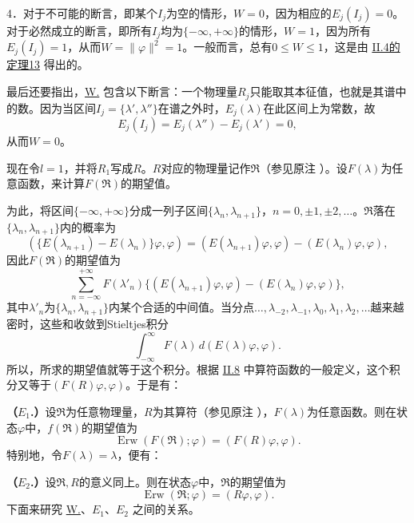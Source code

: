 \documentclass[fontsize=13pt,twoside,openany,headings=normal,parskip=false,bookmarkpackage=false,DIV=calc]{scrbook}
\begin{document}
\hypertarget{origpage-105}{}\label{origpage-105}4．对于不可能的断言，即某个$I_j$为空的情形，$W=0$，因为相应的$E_j(I_j)=0$。对于必然成立的断言，即所有$I_j$均为$\{-\infty,\allowbreak +\infty\}$的情形，$W=1$，因为所有$E_j(I_j)=1$，从而$W=\|\varphi\|^2=1$。一般而言，总有$0\le W\le1$，这是由 \hyperref[thm:II.13]{II.4的定理13} 得出的。

最后还要指出，\hyperref[post:III.1.W]{W.} 包含以下断言：一个物理量$R_j$只能取其本征值，也就是其谱中的数。因为当区间$I_j=\{\lambda',\allowbreak \lambda''\}$在谱之外时，$E_j(\lambda)$在此区间上为常数，故
\[
E_j(I_j)=E_j(\lambda'')-E_j(\lambda')=0,
\]
从而$W=0$。

现在令$l=1$，并将$R_1$写成$R$。$R$对应的物理量记作$\mathfrak R$（参见原注 \hyperlink{note-119}{}）。设$F(\lambda)$为任意函数，来计算$F(\mathfrak R)$的期望值。

为此，将区间$\{-\infty,\allowbreak +\infty\}$分成一列子区间$\{\lambda_n,\allowbreak \lambda_{n+1}\}$，$n=0,\allowbreak \pm1,\allowbreak \pm2,\allowbreak \ldots$。$\mathfrak R$落在$\{\lambda_n,\allowbreak \lambda_{n+1}\}$内的概率为
\[
(\{E(\lambda_{n+1})-E(\lambda_n)\}\varphi,\varphi)
=(E(\lambda_{n+1})\varphi,\varphi)-(E(\lambda_n)\varphi,\varphi),
\]
因此$F(\mathfrak R)$的期望值为
\[
\sum_{n=-\infty}^{+\infty}F(\lambda'_n)
\{(E(\lambda_{n+1})\varphi,\varphi)-(E(\lambda_n)\varphi,\varphi)\},
\]
其中$\lambda'_n$为$\{\lambda_n,\allowbreak \lambda_{n+1}\}$内某个合适的中间值。当分点$\ldots,\allowbreak \lambda_{-2},\allowbreak \lambda_{-1},\allowbreak \lambda_0,\allowbreak \lambda_1,\allowbreak \lambda_2,\allowbreak \ldots$越来越密时，这些和收敛到Stieltjes积分
\[
\int_{-\infty}^{\infty}F(\lambda)\,d(E(\lambda)\varphi,\varphi).
\]
所以，所求的期望值就等于这个积分。根据 \hyperref[sec:II.8]{II.8} 中算符函数的一般定义，这个积分又等于$(F(R)\varphi,\allowbreak \varphi)$。于是有：

\leavevmode{}\label{post:III.1.E1}\textbf{（$E_1$.）}设$\mathfrak R$为任意物理量，$R$为其算符（参见原注 \hyperlink{note-119}{}），$F(\lambda)$为任意函数。则在状态$\varphi$中，$f(\mathfrak R)$的期望值为
\[
\operatorname{Erw}(F(\mathfrak R);\varphi)=(F(R)\varphi,\varphi).
\]
特别地，令$F(\lambda)=\lambda$，便有：

\leavevmode{}\label{post:III.1.E2}\textbf{（$E_2$.）}设$\mathfrak R,\allowbreak R$的意义同上。则在状态$\varphi$中，$\mathfrak R$的期望值为
\[
\operatorname{Erw}(\mathfrak R;\varphi)=(R\varphi,\varphi).
\]
下面来研究 \hyperref[post:III.1.W]{W.}、\hyperref[post:III.1.E1]{$E_1$}、\hyperref[post:III.1.E2]{$E_2$} 之间的关系。
\end{document}
